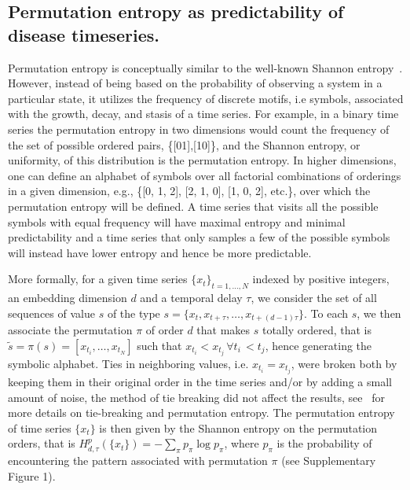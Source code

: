 \documentclass[fleqn,12pt]{wlscirep}
\begin{document}
\subsection*{Permutation entropy as predictability of disease timeseries.} 
Permutation entropy is conceptually similar to the well-known Shannon entropy~\cite{bandt2002permutation}.  However, instead of being based on the probability of observing a system in a particular state, it utilizes the frequency of discrete motifs, i.e symbols, associated with the growth, decay, and stasis of a time series.  For example, in a binary time series the permutation entropy in two dimensions would count the frequency of the set of possible ordered pairs, \{[01],[10]\}, and the Shannon entropy, or uniformity, of this distribution is the permutation entropy.  In higher dimensions, one can define an alphabet of symbols over all factorial combinations of orderings in a given dimension, e.g., \{[0, 1, 2], [2, 1, 0], [1, 0, 2], etc.\}, over which the permutation entropy will be defined.  A time series that visits all the possible symbols with equal frequency will have maximal entropy and minimal predictability and a time series that only samples a few of the possible symbols will instead have lower entropy and hence be more predictable.

More formally, for a given time series $\{x_ t \}_{t =1, \ldots, N}$ indexed by positive integers, an embedding dimension $d$ and a temporal delay $\tau$, we consider the set of all sequences of value $s$ of the type $s = \{ x_t, x_{t+\tau}, \ldots, x_{t+ (d-1)\tau} \}$. To each $s$, we then associate the permutation $\pi$ of order $d$ that makes $s$ totally ordered, that is $\tilde{s} = \pi(s) = [x_{t_i}, \ldots,x_{t_N}]$ such that $x_{t_i} < x_{t_j} \, \forall t_i \, < t_j$, hence generating the symbolic alphabet. Ties in neighboring values, i.e. $x_{t_i} = x_{t_j}$, were broken both by keeping them in their original order in the time series and\slash or by adding a small amount of noise, the method of tie breaking did not affect the results, see~\cite{zunino2017permutation} for more details on tie-breaking and permutation entropy. The permutation entropy of time series $\{x_t\}$ is then given by the Shannon entropy on the permutation orders, that is $H^p_{d,\tau} (\{ x_t\}) = - \sum_\pi p_\pi \log p_\pi$, where $p_\pi$ is the probability of encountering the pattern associated with permutation $\pi$ (see Supplementary Figure 1).  
\end{document}
